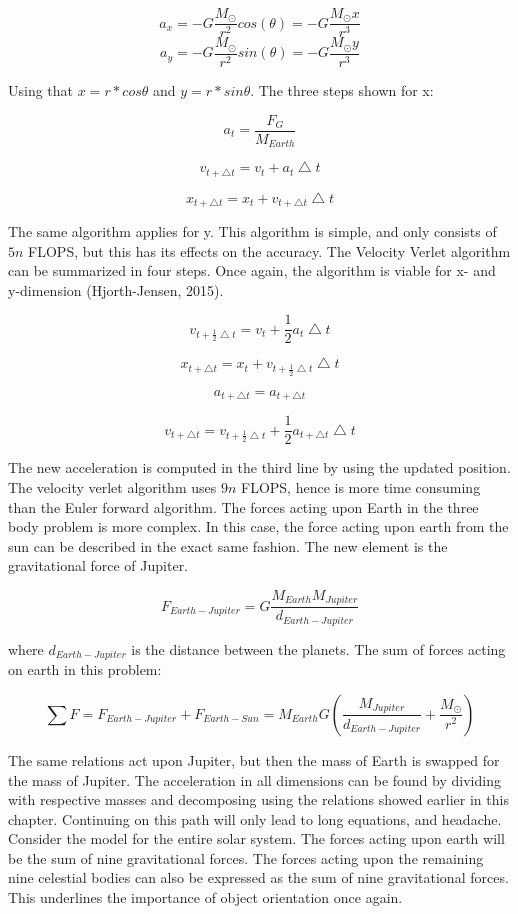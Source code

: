 \documentclass[10pt,a4paper]{article}
\begin{document}
$$a_x=-G\frac{M_{\odot}}{r^2}cos(\theta)=-G\frac{M_{\odot}x}{r^3}$$
$$a_y=-G\frac{M_{\odot}}{r^2}sin(\theta)=-G\frac{M_{\odot}y}{r^3}$$

\noindent Using that $x=r*cos\theta$ and $y=r*sin\theta$.  The three steps shown for x:

$$a_t=\frac{F_G}{M_{Earth}}$$

$$v_{t+\bigtriangleup t}=v_t + a_t\bigtriangleup t $$

$$x_{t+\bigtriangleup t}=x_t + v_{t+\bigtriangleup t}\bigtriangleup t$$

\noindent The same algorithm applies for y. This algorithm is simple, and only consists of $5n$ FLOPS, but this has its effects on the accuracy. The Velocity Verlet algorithm can be summarized in four steps. Once again, the algorithm is viable for x- and y-dimension (Hjorth-Jensen, 2015).  



$$v_{t+\frac{1}{2}\bigtriangleup t}=v_t + \frac{1}{2}a_t\bigtriangleup t$$

$$x_{t+\bigtriangleup t}=x_t + v_{t+\frac{1}{2}\bigtriangleup t}\bigtriangleup t $$




$$a_{t+\bigtriangleup t}=a_{t+\bigtriangleup t}$$

$$v_{t+\bigtriangleup t}=v_{t+\frac{1}{2}\bigtriangleup t} + \frac{1}{2}a_{t+\bigtriangleup t}\bigtriangleup t$$


\noindent The new acceleration is computed in the third line by using the updated position. The velocity verlet algorithm uses $9n$ FLOPS, hence is more time consuming than the Euler forward algorithm. The forces acting upon Earth in the three body problem is more complex. In this case, the force acting upon earth from the sun can be described in the exact same fashion. The new element is the gravitational force of Jupiter. 

$$F_{Earth-Jupiter}=G\frac{M_{Earth}M_{Jupiter}}{d_{Earth-Jupiter}}$$

\noindent where $d_{Earth-Jupiter}$ is the distance between the planets. The sum of forces acting on earth in this problem: 

$$\sum F = F_{Earth-Jupiter}+ F_{Earth-Sun}= M_{Earth}G(\frac{M_{Jupiter}}{d_{Earth-Jupiter}} + \frac{M_{\odot}}{r^2}) $$

\noindent The same relations act upon Jupiter, but then the mass of Earth is swapped for the mass of Jupiter. The acceleration in all dimensions can be found by dividing with respective masses and decomposing using the relations showed earlier in this chapter. Continuing on this path will only lead to long equations, and headache. Consider the model for the entire solar system. The forces acting upon earth will be the sum of nine gravitational forces. The forces acting upon the remaining nine celestial bodies can also be expressed as the sum of nine gravitational forces. This underlines the importance of object orientation once again.\\
\end{document}

